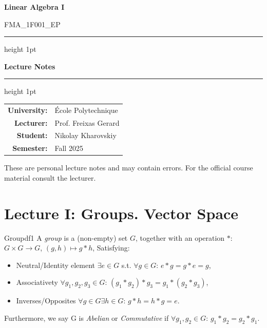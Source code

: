 \documentclass[11pt, a4paper]{article}
\newcommand{\CourseName}{Linear Algebra I}
\newcommand{\CourseCode}{FMA\_1F001\_EP}
\newcommand{\University}{École Polytechnique}
\newcommand{\Lecturer}{Prof. Freixas Gerard}
\newcommand{\StudentName}{Nikolay Kharovskiy}
\newcommand{\Semester}{Fall 2025}
\begin{document}
\begin{titlepage}
  \centering
  \vspace*{2cm}

  {\Huge\bfseries \CourseName\par}
  \vspace{0.5cm}
  {\large \CourseCode\par}

  \vspace{1.5cm}
  \hrule height 1pt
  \vspace{0.4cm}
  {\Large\bfseries Lecture Notes \par}
  \vspace{0.4cm}
  \hrule height 1pt

  \vspace{2cm}

  \begin{tabular}{rl}
    \textbf{University:} & \University\\[8pt]
    \textbf{Lecturer:}   & \Lecturer\\[8pt]
    \textbf{Student:}    & \StudentName\\[8pt]
    \textbf{Semester:}   & \Semester\\[8pt]
  \end{tabular}

  \vfill

  {\small These are personal lecture notes and may contain errors.
         For the official course material consult the lecturer.}
\end{titlepage}

\tableofcontents
\newpage

\section{Lecture I: Groups. Vector Space}

\begin{definition}{Group}{df1}
  A \emph{group} is a (non-empty) set $G$, together with an operation $*$: $G \times G \longrightarrow G$, $(g, h) \longmapsto g*h$, 
  Satisfying: 
  \begin{itemize}
    \item Neutral/Identity element $\exists e \in G$ s.t. $\forall g \in G$: $e*g = g*e = g$,
    \item Associativety $\forall g_1, g_2, g_3 \in G$: $(g_1 * g_2) * g_3 = g_1 * (g_2 * g_3)$,
    \item Inverses/Opposites $\forall g \in G \exists h \in G$: $g*h = h*g = e$.
  \end{itemize}

  Furthermore, we say G is \emph{Abelian} or \emph{Commutative} if $\forall g_1, g_2 \in G$: $g_1 * g_2 = g_2 * g_1$.
\end{definition}
\end{document}
